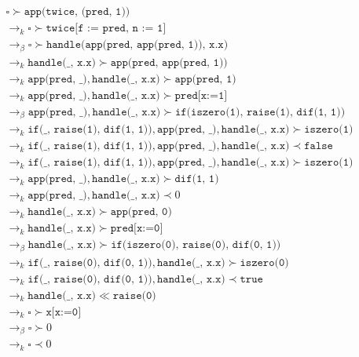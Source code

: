 \documentclass{article}
\newcommand{\tx}[1]{\texttt{#1}}
\newcommand{\ra}{\rightarrow}
\begin{document}
\begin{enumerate}
{\begin{itemize}
{			\begin{align*}
				&\square \succ \tx{app(twice, (pred, 1))} \\
				&\ra_k \square \succ \tx{twice[f := pred, n := 1]}\\
				&\ra_{\beta} \square \succ \tx{handle(app(pred, app(pred, 1)), x.x)} \\
				&\ra_k \tx{handle(\_, x.x)} \succ \tx{app(pred, app(pred, 1))} \\
				&\ra_k \tx{app(pred, \_)}, \tx{handle(\_, x.x)} \succ \tx{app(pred, 1)} \\
				&\ra_k \tx{app(pred, \_)}, \tx{handle(\_, x.x)} \succ \tx{pred[x:=1]} \\
				&\ra_{\beta} \tx{app(pred, \_)}, \tx{handle(\_, x.x)} \succ \tx{if(iszero(1), raise(1), dif(1, 1))} \\
				&\ra_k \tx{if(\_, raise(1), dif(1, 1))}, \tx{app(pred, \_)}, \tx{handle(\_, x.x)} \succ \tx{iszero(1)} \\
				&\ra_k \tx{if(\_, raise(1), dif(1, 1))}, \tx{app(pred, \_)}, \tx{handle(\_, x.x)} \prec \tx{false} \\
				&\ra_k \tx{if(\_, raise(1), dif(1, 1))}, \tx{app(pred, \_)}, \tx{handle(\_, x.x)} \succ \tx{iszero(1)} \\
				&\ra_k \tx{app(pred, \_)}, \tx{handle(\_, x.x)} \succ \tx{dif(1, 1)} \\
				&\ra_k \tx{app(pred, \_)}, \tx{handle(\_, x.x)} \prec 0 \\
				&\ra_k \tx{handle(\_, x.x)} \succ \tx{app(pred, 0)} \\
				&\ra_k \tx{handle(\_, x.x)} \succ \tx{pred[x:=0]} \\
				&\ra_{\beta} \tx{handle(\_, x.x)} \succ \tx{if(iszero(0), raise(0), dif(0, 1))} \\
				&\ra_k \tx{if(\_, raise(0), dif(0, 1))}, \tx{handle(\_, x.x)} \succ \tx{iszero(0)} \\
				&\ra_k \tx{if(\_, raise(0), dif(0, 1))}, \tx{handle(\_, x.x)} \prec \tx{true} \\
				&\ra_k \tx{handle(\_, x.x)} \ll \tx{raise(0)} \\
				&\ra_k \square \succ \tx{x[x:=0]} \\
				&\ra_{\beta} \square \succ 0 \\
				&\ra_k \square \prec 0 \\
			\end{align*}
			}
		\end{itemize}
		
		}
	\end{enumerate}
\end{document}
